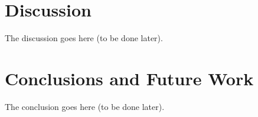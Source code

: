 \documentclass[conference]{IEEEtran}
\begin{document}
\section{Discussion}
The discussion goes here (to be done later).

\section{Conclusions and Future Work}
The conclusion goes here (to be done later).







\nocite{*}




\end{document}
